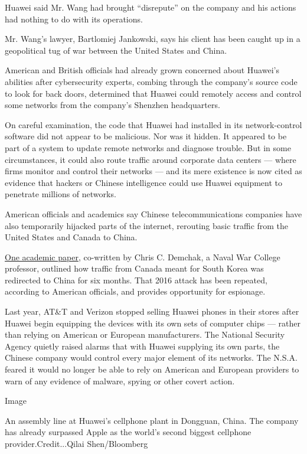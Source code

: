 Huawei said Mr. Wang had brought ``disrepute'' on the company and his
actions had nothing to do with its operations.

Mr. Wang's lawyer, Bartlomiej Jankowski, says his client has been caught
up in a geopolitical tug of war between the United States and China.

American and British officials had already grown concerned about
Huawei's abilities after cybersecurity experts, combing through the
company's source code to look for back doors, determined that Huawei
could remotely access and control some networks from the company's
Shenzhen headquarters.

On careful examination, the code that Huawei had installed in its
network-control software did not appear to be malicious. Nor was it
hidden. It appeared to be part of a system to update remote networks and
diagnose trouble. But in some circumstances, it could also route traffic
around corporate data centers --- where firms monitor and control their
networks --- and its mere existence is now cited as evidence that
hackers or Chinese intelligence could use Huawei equipment to penetrate
millions of networks.

American officials and academics say Chinese telecommunications
companies have also temporarily hijacked parts of the internet,
rerouting basic traffic from the United States and Canada to China.

\href{https://scholarcommons.usf.edu/cgi/viewcontent.cgi?article=1050\&context=mca}{One
academic paper}, co-written by Chris C. Demchak, a Naval War College
professor, outlined how traffic from Canada meant for South Korea was
redirected to China for six months. That 2016 attack has been repeated,
according to American officials, and provides opportunity for espionage.

Last year, AT\&T and Verizon stopped selling Huawei phones in their
stores after Huawei begin equipping the devices with its own sets of
computer chips --- rather than relying on American or European
manufacturers. The National Security Agency quietly raised alarms that
with Huawei supplying its own parts, the Chinese company would control
every major element of its networks. The N.S.A. feared it would no
longer be able to rely on American and European providers to warn of any
evidence of malware, spying or other covert action.

Image

An assembly line at Huawei's cellphone plant in Dongguan, China. The
company has already surpassed Apple as the world's second biggest
cellphone provider.Credit...Qilai Shen/Bloomberg

